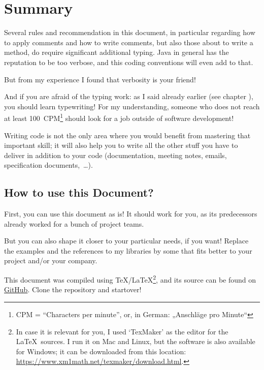\chapter{Summary}
Several rules and recommendation in this document, in particular regarding how to apply comments and how to write comments, but also those about to write a method, do require significant additional typing. Java in general has the reputation to be too verbose, and this coding conventions will even add to that.

But from my experience I found that verbosity is your friend!

And if you are afraid of the typing work: as I said already earlier (see chapter ), you should learn typewriting! For my understanding, someone who does not reach at least 100~CPM\footnote{CPM = “Characters per minute”, or, in German: „Anschläge pro Minute“} should look for a job outside of software development!

Writing code is not the only area where you would benefit from mastering that important skill; it will also help you to write all the other stuff you have to deliver in addition to your code (documentation, meeting notes, emails, specification documents,~…).

\section{How to use this Document?}
First, you can use this document as is! It should work for you, as its predecessors already worked for a bunch of project teams.

But you can also shape it closer to your particular needs, if you want! Replace the examples and the references to my libraries by some that fits better to your project and/or your company.

This document was compiled using \TeX/\LaTeX\footnote{In case it is relevant for you, I used ‘TexMaker’ as the editor for the \LaTeX~sources. I run it on Mac and Linux, but the software is also available for Windows; it can be downloaded from this location: \href{https://www.xm1math.net/texmaker/download.html}{https://www.xm1math.net/texmaker/download.html}.}, and its source can be found on  \href{https://github.com/tquadrat/documents}{GitHub}. Clone the repository and startover!

